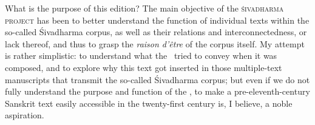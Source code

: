 What is the purpose of this edition? The main 
objective of the \textsc{śiva\-dharma project} 
has been to better understand the function of 
individual texts within the so-called Śivadharma corpus, 
as well as their relations and interconnectedness, or
lack thereof, and thus to grasp 
the \emph{raison d'être} of the corpus itself. 
My attempt is rather simplistic: to understand
what the \Vss\ tried to convey when it was composed, and
to explore why this text got inserted in those multiple-text 
manuscripts that transmit the so-called Śivadharma corpus; but even if we do not fully understand
the purpose and function of the \Vss, 
to make a pre-eleventh-century
Sanskrit text easily accessible in the twenty-first century is,
I believe, a noble aspiration.

\vfill
\pagebreak





